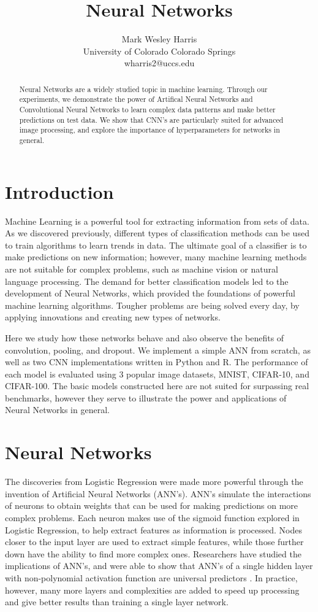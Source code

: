 \documentclass[letterpaper]{article} %
\title{Neural Networks}
\author{Mark Wesley Harris\\ %
University of Colorado Colorado Springs\\
wharris2@uccs.edu %
}
\begin{document}
\maketitle

\begin{abstract}
Neural Networks are a widely studied topic in machine learning.
Through our experiments, we demonstrate the power of
Artifical Neural Networks and Convolutional Neural Networks
to learn complex data patterns and make better predictions on test data.
We show that CNN's are particularly suited for advanced image processing,
and explore the importance of hyperparameters for networks in general.
\end{abstract}

\section{Introduction}
Machine Learning is a powerful tool for extracting information from sets of data.
As we discovered previously, different types of classification methods can be used to
train algorithms to learn trends in data.
The ultimate goal of a classifier is to make predictions on new information;
however, many machine learning methods are not suitable for
complex problems, such as machine vision or natural language processing.
The demand for better classification models led to the development of Neural Networks,
which provided the foundations of powerful machine learning algorithms.
Tougher problems are being solved every day, by applying innovations and creating new types of networks.

Here we study how these networks behave and also observe the benefits of convolution,
pooling, and dropout.
We implement a simple ANN from scratch, as well as two CNN implementations written in
Python and R.
The performance of each model is evaluated using 3 popular image datasets, MNIST, CIFAR-10, and CIFAR-100.
The basic models constructed here are not suited for surpassing real benchmarks,
however they serve to illustrate the power and applications of Neural Networks in general.

\section{Neural Networks}
The discoveries from Logistic Regression were made more powerful through the invention of Artificial Neural Networks (ANN's).
ANN's simulate the interactions of neurons to obtain weights that can be used
for making predictions on more complex problems.
Each neuron makes use of the sigmoid function explored in Logistic Regression, to help extract features
as information is processed. Nodes closer to the input layer are used to extract simple features,
while those further down have the ability to find more complex ones.
Researchers have studied the implications of ANN's,
and were able to show that ANN's of a single hidden layer with non-polynomial activation function are
universal predictors \cite{universal}. In practice, however, many more layers and complexities are added to
speed up processing and give better results than training a single layer network.
\end{document}
